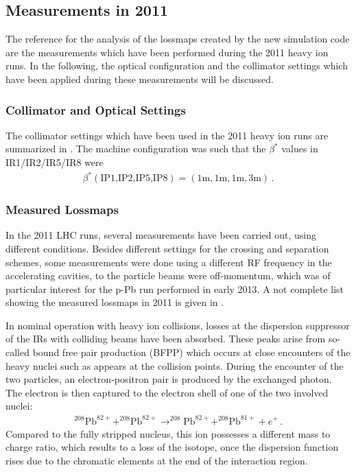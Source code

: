\subsection{Measurements in 2011}
The reference for the analysis of the lossmaps created by the new simulation code are the measurements which have been performed during the 2011 heavy ion runs. In the following, the optical configuration and the collimator settings which have been applied during these measurements will be discussed.
\subsubsection{Collimator and Optical Settings}
The collimator settings which have been used in the 2011 heavy ion runs are summarized in . The machine configuration was such that the $\beta^*$ values in IR1/IR2/IR5/IR8 were
\begin{align}
\beta^*(\text{IP1,IP2,IP5,IP8}) = (1\text{m},1\text{m},1\text{m},3\text{m}) \, .
\end{align}


\subsubsection{Measured Lossmaps}\label{140619}
In the 2011 LHC runs, several measurements have been carried out, using different conditions. Besides different settings for the crossing and separation schemes, some measurements were done using a different RF frequency in the accelerating cavities, to the particle beams were off-momentum, which was of particular interest for the p-Pb run performed in early 2013. A not complete list showing the measured lossmaps in 2011 is given in . 

In nominal operation with heavy ion collisions, losses at the dispersion suppressor of the IRs with colliding beams have been absorbed. These peaks arise from so-called bound free pair production (BFPP) which occurs at close encounters of the heavy nuclei such as appears at the collision points. During the encounter of the two particles, an electron-positron pair is produced by the exchanged photon. The electron is then captured to the electron shell of one of the two involved nuclei:
\begin{align}
^{208}\text{Pb}^{82+} + ^{208}\text{Pb}^{82+} \rightarrow ^{208}\text{Pb}^{82+} + ^{208}\text{Pb}^{81+} + e^+ \, .
\end{align}
Compared to the fully stripped nucleus, this ion possesses a different mass to charge ratio, which results to a loss of the isotope, once the dispersion function rises due to the chromatic elements at the end of the interaction region. 

